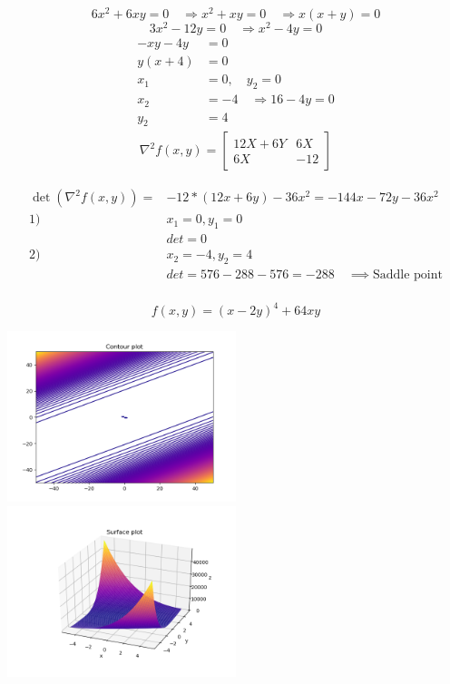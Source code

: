 \documentclass[12pt]{article}         %
\begin{document}
$$
6x^2+6xy=0 \quad\Rightarrow x^2+xy=0 \quad\Rightarrow x(x+y)=0 %
$$
$$
3x^2-12y=0 \quad\Rightarrow x^2-4y=0
$$
$$
\begin{aligned}
-xy-4y&=0\\
y(x+4)&=0\\
x_1&=0, \quad y_2=0\\
x_2&=-4 \quad\Rightarrow 16-4y=0\\
y_2&=4
\end{aligned}
$$
\begin{gather}
\nabla^2 f(x,y) = 
  \begin{bmatrix}
  12 X + 6Y &
   6X\\
   6X &
   -12 
   \end{bmatrix}
    \nonumber %
\end{gather}


$$
\begin{aligned}
\det\left(\nabla^2 f(x,y)\right)=&-12*(12x+6y) - 36x^2= -144x-72y-36x^2\\
1)\: &x_1=0, y_1=0\\
&det=0 \\ %
2)\: &x_2=-4, y_2=4\\
&det=576-288-576=-288 \quad\implies \text{Saddle point}
\end{aligned}
$$\\

\begin{equation}
	f(x,y) = (x - 2y)^4 + 64xy
\end{equation}

\includegraphics[width=0.5\textwidth]{Figure_2}
\includegraphics[width=0.5\textwidth]{Surface_2}
\end{document}
